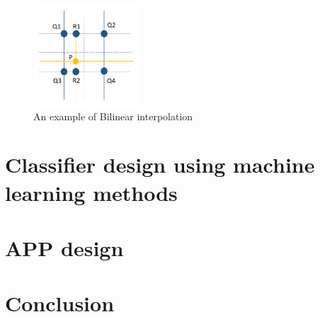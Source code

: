 \documentclass[hyperref]{article}
\theoremstyle{nonumberplain}
\begin{document}
	
	\begin{figure}[htbp]
		\centering
		\includegraphics[width=4cm]{bi.png}
		\caption{An example of Bilinear interpolation}
		\label{fig23}
	\end{figure}
	
	
	\section{Classifier design using machine learning methods}
	
	\section{APP design}
	
	\section{Conclusion}
	
	\hspace{1.0em}
	
	
	
	
%	
%	
	
	\newpage
	
%		
%		
%		
	
\end{document}
